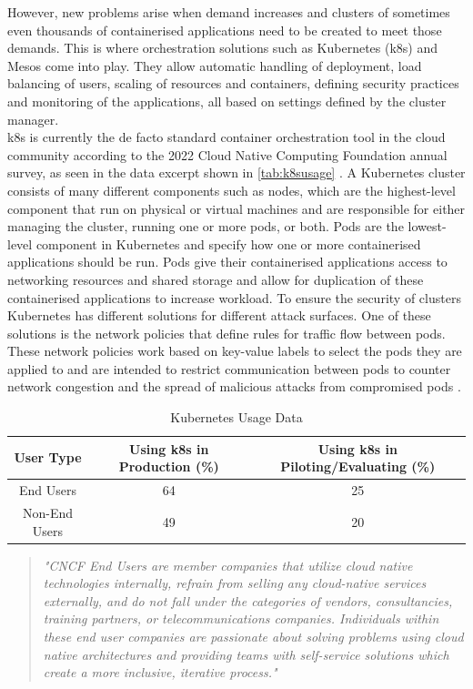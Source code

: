  However, new problems arise when demand increases and clusters of sometimes even thousands of containerised applications need to be created to meet those demands. This is where orchestration solutions such as Kubernetes (\acrshort{k8s}) \cite{Bernstein2014} and Mesos \cite{Mesos} come into play. They allow automatic handling of deployment, load balancing of users, scaling of resources and containers, defining security practices and monitoring of the applications, all based on settings defined by the cluster manager.
\\[10pt]

\acrshort{k8s} is currently the de facto standard container orchestration tool in the cloud community according to the 2022 Cloud Native Computing Foundation annual survey, as seen in the data excerpt shown in \autoref{tab:k8susage} \cite{CNCFSurvey}. A Kubernetes cluster consists of many different components such as nodes, which are the highest-level component that run on physical or virtual machines and are responsible for either managing the cluster, running one or more pods, or both. Pods are the lowest-level component in Kubernetes and specify how one or more containerised applications should be run. Pods give their containerised applications access to networking resources and shared storage and allow for duplication of these containerised applications to increase workload. To ensure the security of clusters Kubernetes has different solutions for different attack surfaces. One of these solutions is the network policies that define rules for traffic flow between pods. These network policies work based on key-value labels to select the pods they are applied to and are intended to restrict communication between pods to counter network congestion and the spread of malicious attacks from compromised pods \cite{nps}.
\\[10pt]
\begin{table}[h]
    \centering
    \begin{tabular}{|c|c|c|}
        \hline
        \textbf{User Type} & \textbf{Using \acrshort{k8s} in Production (\%)} & \textbf{Using \acrshort{k8s} in Piloting/Evaluating (\%)} \\
        \hline
        End Users & 64 & 25 \\
        Non-End Users & 49 & 20 \\
        \hline
    \end{tabular}
    \caption{Kubernetes Usage Data \cite{CNCFSurvey}}
    \label{tab:k8susage}
\end{table}
\begin{quote}
\textit{"CNCF End Users are member companies that utilize cloud native technologies internally, refrain from selling any cloud-native services externally, and do not fall under the categories of vendors, consultancies, training partners, or telecommunications companies. Individuals within these end user companies are passionate about solving problems using cloud native architectures and providing teams with self-service solutions which create a more inclusive, iterative process." \cite{CNCFSurvey}}
\end{quote}

